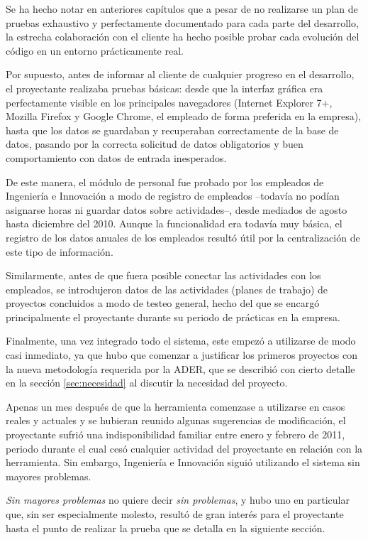 Se ha hecho notar en anteriores capítulos que a pesar de no realizarse un
plan de pruebas exhaustivo y perfectamente documentado para cada parte del
desarrollo, la estrecha colaboración con el cliente ha hecho posible probar cada
evolución del código en un entorno prácticamente real.

Por supuesto, antes de informar al cliente de cualquier progreso en el
desarrollo, el proyectante realizaba pruebas básicas: desde que la interfaz
gráfica era perfectamente visible en los principales navegadores (Internet
Explorer 7+, Mozilla Firefox y Google Chrome, el empleado de forma preferida en
la empresa), hasta que los datos se guardaban y recuperaban correctamente de la
base de datos, pasando por la correcta solicitud de datos obligatorios y buen
comportamiento con datos de entrada inesperados.

De este manera, el módulo de personal fue probado por los empleados de
Ingeniería e Innovación a modo de registro de empleados --todavía no podían
asignarse horas ni guardar datos sobre actividades--, desde mediados de
agosto hasta diciembre del 2010. Aunque la funcionalidad era todavía muy básica,
el registro de los datos anuales de los empleados resultó útil por la
centralización de este tipo de información.

Similarmente, antes de que fuera posible conectar las actividades con los
empleados, se introdujeron datos de las actividades (planes de trabajo) de
proyectos concluidos a modo de testeo general, hecho del que se encargó
principalmente el proyectante durante su periodo de prácticas en la empresa.

Finalmente, una vez integrado todo el sistema, este empezó a utilizarse de
modo casi inmediato, ya que hubo que comenzar a justificar los primeros
proyectos con la nueva metodología requerida por la ADER, que se
describió con cierto detalle en la sección  \ref{sec:necesidad} al discutir la
necesidad del proyecto.

Apenas un mes después de que la herramienta comenzase a utilizarse en casos
reales y actuales y se hubieran reunido algunas sugerencias de modificación,
el proyectante sufrió una indisponibilidad familiar entre enero y febrero de
2011, periodo durante el cual cesó cualquier actividad del proyectante en
relación con la herramienta. Sin embargo, Ingeniería e Innovación siguió
utilizando el sistema sin mayores problemas.

\textit{Sin mayores problemas} no quiere decir \textit{sin problemas}, y hubo
uno en particular que, sin ser especialmente molesto, resultó de gran interés
para el proyectante hasta el punto de realizar la prueba que se detalla en la
siguiente sección.


